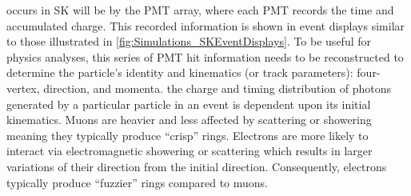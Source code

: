   occurs in SK will be   by the PMT array, where each PMT records the time and accumulated charge. This recorded information is shown in event displays similar to those illustrated in \autoref{fig:Simulations_SKEventDisplays}. To be useful for physics analyses, this series of PMT hit information needs to be reconstructed to determine the particle's identity and kinematics (or track parameters): four-vertex, direction, and momenta.   the charge and timing distribution of photons generated by a particular particle in an event is dependent upon its initial kinematics.   Muons are heavier and less affected by scattering or showering meaning they typically produce ``crisp'' rings. Electrons are more likely to interact via electromagnetic showering or scattering which results in larger variations of their direction from the initial direction. Consequently, electrons typically produce ``fuzzier'' rings compared to muons. 


